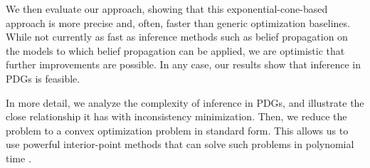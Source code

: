 We then evaluate our approach, showing 
that this exponential-cone-based approach is more precise
and, often, faster than generic optimization baselines.
While not currently as fast as inference methods such as belief
propagation on the models to which belief propagation can be applied,
we are optimistic that further improvements are possible.
In any case, our results show that inference in PDGs is feasible.

 
% 
%
%
In more detail,
we analyze the complexity of inference in PDGs, and illustrate
the close relationship it has with inconsistency minimization.
%
Then, we reduce the problem to a convex optimization problem in standard
form.
This allows us to use powerful interior-point methods
that can solve such problems in polynomial time \parencite{dahl2022primal}. 

